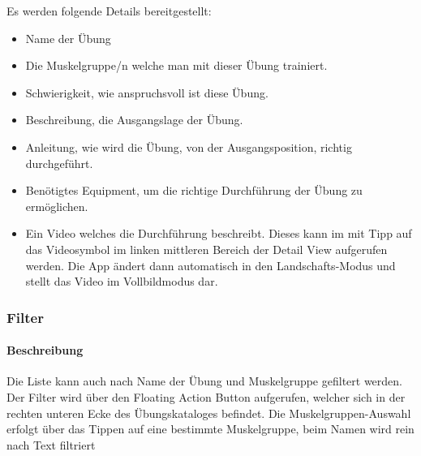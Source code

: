 \documentclass[FIPLY_base.tex]{subfiles}
\begin{document}
Es werden folgende Details bereitgestellt:

\begin{itemize}
\item Name der Übung
\item Die Muskelgruppe/n welche man mit dieser Übung trainiert.
\item Schwierigkeit, wie anspruchsvoll ist diese Übung.
\item Beschreibung, die Ausgangslage der Übung.
\item Anleitung, wie wird die Übung, von der Ausgangsposition, richtig durchgeführt.
\item Benötigtes Equipment, um die richtige Durchführung der Übung zu ermöglichen.
\item Ein Video welches die Durchführung beschreibt. Dieses kann im mit Tipp auf das Videosymbol im linken mittleren Bereich der Detail View aufgerufen werden.
Die App ändert dann automatisch in den Landschafts-Modus und stellt das Video im Vollbildmodus dar.

\end{itemize}



\subsubsection{Filter}
\paragraph{Beschreibung}
Die Liste kann auch nach Name der Übung und Muskelgruppe gefiltert werden. 
Der Filter wird über den Floating Action Button aufgerufen, welcher sich in der rechten unteren Ecke des Übungskataloges befindet.
Die Muskelgruppen-Auswahl erfolgt über das Tippen auf eine bestimmte Muskelgruppe, beim Namen wird rein nach Text filtriert
\end{document}
